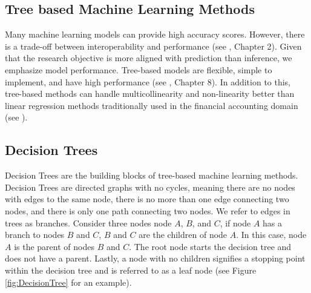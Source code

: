 
\subsection{Tree based Machine Learning Methods}

Many machine learning models can provide high accuracy scores. However, there is a trade-off between interoperability and performance (see  \cite{ISL}, Chapter 2).  Given that the research objective is more aligned with prediction than inference, we emphasize model performance. Tree-based models are flexible, simple to implement, and have high performance (see \cite{ISL},  Chapter 8). In addition to this, tree-based methods can handle multicollinearity and non-linearity better than linear regression methods traditionally used in the financial accounting domain (see \cite{Monahan}).  

\subsection{Decision Trees} \label{sec:DecisionTrees}

Decision Trees are the building blocks of tree-based machine learning methods.  Decision Trees are directed graphs with no cycles, meaning there are no nodes with edges to the same node, there is no more than one edge connecting two nodes, and there is only one path connecting two nodes.  We refer to edges in trees as branches.  Consider three nodes node \(A\),  \(B\), and \(C\), if node \(A\) has a branch to nodes \(B\) and \(C\),  \(B\) and \(C\) are the children of node \(A\). In this case, node \(A\) is the parent of nodes \(B\) and \(C\).  The root node starts the decision tree and does not have a parent.  Lastly, a node with no children signifies a stopping point  within the decision tree and is referred to as a leaf node (see Figure \ref{fig:DecisionTree} for an example).

